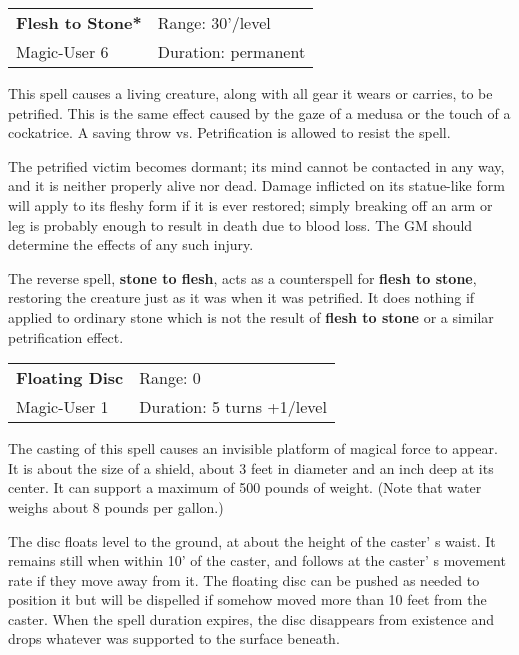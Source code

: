 \documentclass[a4paper,twoside,openany,10pt]{book}
\begin{document}
\begin{multicols}{2}
\smallskip\begin{flushleft} 
	\begin{tabularx}{0.45\textwidth}{@{}m{3.5cm}m{5.5cm}@{}} 
		\textbf{Flesh to Stone*} & Range: 30'/level\\
Magic-User 6 & Duration: permanent\\
	\end{tabularx}\end{flushleft}

This spell causes a living creature, along with all gear it wears or carries, to be petrified. This is the same effect caused by the gaze of a medusa or the touch of a cockatrice. A saving throw vs. Petrification is allowed to resist the spell.

The petrified victim becomes dormant; its mind cannot be contacted in any way, and it is neither properly alive nor dead. Damage inflicted on its statue-like form will apply to its fleshy form if it is ever restored; simply breaking off an arm or leg is probably enough to result in death due to blood loss. The GM should determine the effects of any such injury.

The reverse spell, \textbf{stone to flesh}, acts as a counterspell for \textbf{flesh to stone}, restoring the creature just as it was when it was petrified. It does nothing if applied to ordinary stone which is not the result of \textbf{flesh to stone} or a similar petrification effect.

\smallskip\begin{flushleft} 
	\begin{tabularx}{0.45\textwidth}{@{}m{3.5cm}m{5.5cm}@{}} 
		\textbf{Floating Disc} & Range: 0\\
Magic-User 1 &Duration: 5 turns +1/level\\
	\end{tabularx}\end{flushleft}


The casting of this spell causes an invisible platform of magical force to appear. It is about the size of a shield, about 3 feet in diameter and an inch deep at its center. It can support a maximum of 500 pounds of weight. (Note that water weighs about 8 pounds per gallon.)

The disc floats level to the ground, at about the height of the caster' s waist. It remains still when within 10' of the caster, and follows at the caster' s movement rate if they move away from it. The floating disc can be pushed as needed to position it but will be dispelled if somehow moved more than 10 feet from the caster. When the spell duration expires, the disc disappears from existence and drops whatever was supported to the surface beneath.


\end{multicols}
\end{document}
